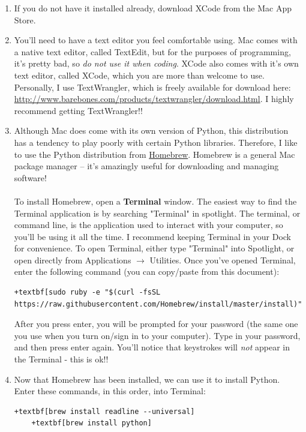 \documentclass{article}
\begin{document}
\begin{enumerate}
	\item If you do not have it installed already, download XCode from the Mac App Store.
	
	\item You'll need to have a text editor you feel comfortable using. Mac comes with a native text editor, called TextEdit, but for the purposes of programming, it's pretty bad, so \emph{do not use it when coding}. XCode also comes with it's own text editor, called XCode, which you are more than welcome to use. Personally, I use TextWrangler, which is freely available for download here: \\ \href{http://www.barebones.com/products/textwrangler/download.html}{http://www.barebones.com/products/textwrangler/download.html}. I highly recommend getting TextWrangler!!
	
	\item Although Mac does come with its own version of Python, this distribution has a tendency to play poorly with certain Python libraries. Therefore, I like to use the Python distribution from \href{https://brew.sh}{Homebrew}. Homebrew is a general Mac package manager -- it's amazingly useful for downloading and managing software! 
	\\\\
	To install Homebrew, open a \textbf{Terminal} window. The easiest way to find the Terminal application is by searching "Terminal" in spotlight. The terminal, or command line, is the application used to interact with your computer, so you'll be using it all the time. I recommend keeping Terminal in your Dock for convenience. To open Terminal, either type "Terminal" into Spotlight, or open directly from Applications $\rightarrow$ Utilities. Once you've opened Terminal, enter the following command (you can copy/paste from this document):
	\begin{Verbatim}[fontsize=\small,xleftmargin=-2.5cm,commandchars=+\[\]]
		+textbf[sudo ruby -e "$(curl -fsSL https://raw.githubusercontent.com/Homebrew/install/master/install)"]
	\end{Verbatim}
	After you press enter, you will be prompted for your password (the same one you use when you turn on/sign in to your computer). Type in your password, and then press enter again. You'll notice that keystrokes will \emph{not} appear in the Terminal - this is ok!!
	
	\item Now that Homebrew has been installed, we can use it to install Python. Enter these commands, in this order, into Terminal: 
	\begin{Verbatim}[fontsize=\small,xleftmargin=-0.95cm,commandchars=+\[\]]
	+textbf[brew install readline --universal]
	+textbf[brew install python]
	\end{Verbatim}
	

\end{enumerate}
\end{document}
